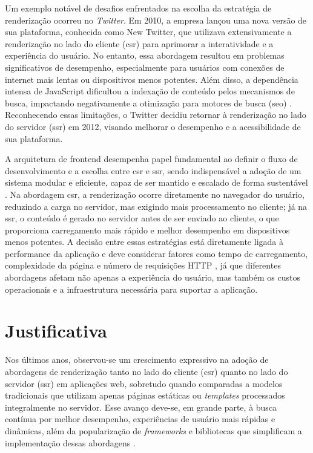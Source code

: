 Um exemplo notável de desafios enfrentados na escolha da estratégia de renderização ocorreu no \emph{Twitter}. Em 2010, a empresa lançou uma nova versão de sua plataforma, conhecida como New Twitter, que utilizava extensivamente a renderização no lado do cliente (\acrshort{csr}) para aprimorar a interatividade e a experiência do usuário. No entanto, essa abordagem resultou em problemas significativos de desempenho, especialmente para usuários com conexões de internet mais lentas ou dispositivos menos potentes. Além disso, a dependência intensa de JavaScript dificultou a indexação de conteúdo pelos mecanismos de busca, impactando negativamente a otimização para motores de busca (\acrshort{seo}) \cite{twitter}. Reconhecendo essas limitações, o Twitter decidiu retornar à renderização no lado do servidor (\acrshort{ssr}) em 2012, visando melhorar o desempenho e a acessibilidade de sua plataforma.

A arquitetura de frontend desempenha papel fundamental ao definir o fluxo de desenvolvimento e a escolha entre \acrshort{csr} e \acrshort{ssr}, sendo indispensável a adoção de um sistema modular e eficiente, capaz de ser mantido e escalado de forma sustentável \cite{frontendGodbolt}. Na abordagem \acrshort{csr}, a renderização ocorre diretamente no navegador do usuário, reduzindo a carga no servidor, mas exigindo mais processamento no cliente; já na \acrshort{ssr}, o conteúdo é gerado no servidor antes de ser enviado ao cliente, o que proporciona carregamento mais rápido e melhor desempenho em dispositivos menos potentes. A decisão entre essas estratégias está diretamente ligada à performance da aplicação e deve considerar fatores como tempo de carregamento, complexidade da página e número de requisições HTTP \cite{webPerformance}, já que diferentes abordagens afetam não apenas a experiência do usuário, mas também os custos operacionais e a infraestrutura necessária para suportar a aplicação.

\section{Justificativa}

Nos últimos anos, observou-se um crescimento expressivo na adoção de abordagens de renderização tanto no lado do cliente (\acrshort{csr}) quanto no lado do servidor (\acrshort{ssr}) em aplicações web, sobretudo quando comparadas a modelos tradicionais que utilizam apenas páginas estáticas ou \emph{templates} processados integralmente no servidor. Esse avanço deve-se, em grande parte, à busca contínua por melhor desempenho, experiências de usuário mais rápidas e dinâmicas, além da popularização de \emph{frameworks} e bibliotecas que simplificam a implementação dessas abordagens \cite{atori2024}.

